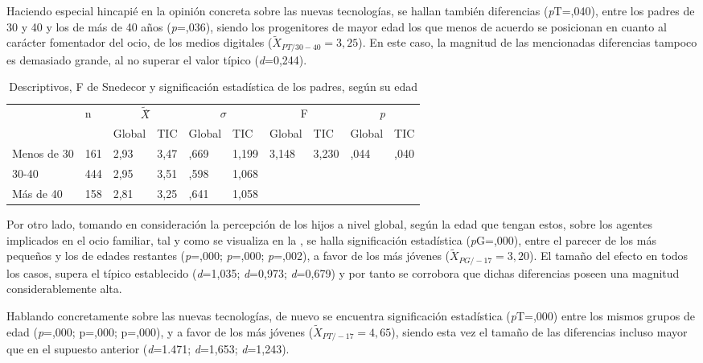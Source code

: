 \documentclass[spanish]{textolivre}
\begin{document}
Haciendo especial hincapié en la opinión concreta sobre las nuevas tecnologías, se hallan también diferencias (\emph{p}T=,040), entre los padres de 30 y 40 y los de más de 40 años (\emph{p}=,036), siendo los progenitores de mayor edad los que menos de acuerdo se posicionan en cuanto al carácter fomentador del ocio, de los medios digitales ($\tilde{X}_{PT/30-40}=3,25$). En este caso, la magnitud de las mencionadas diferencias tampoco es demasiado grande, al no superar el valor típico (\emph{d}=0,244).

\begin{table}[htpb]
\caption{Descriptivos, F de Snedecor y significación estadística de los padres, según su edad}
\label{tab3}
\centering
\begin{tabular}{llllllllll}
\toprule
& \multirow{2}{*}{n} & \multicolumn{2}{c}{$\tilde{X}$̃} & \multicolumn{2}{c}{\begin{math}\sigma\end{math}} & \multicolumn{2}{c}{F} & \multicolumn{2}{c}{\emph{p}}
\\
& & Global & TIC & Global & TIC & Global & TIC & Global & TIC
\\
\midrule
Menos de 30	& 161 & 2,93 & 3,47 & ,669 & 1,199 & 3,148 & 3,230 & ,044 & ,040
\\
30-40 & 444 & 2,95 & 3,51 & ,598 & 1,068 & & & &	 	 
\\
Más de 40 & 158 & 2,81 & 3,25 & ,641 & 1,058 & & & &
\\
\bottomrule
\end{tabular}
\centering
{}
\end{table}

Por otro lado, tomando en consideración la percepción de los hijos a nivel global, según la edad que tengan estos, sobre los agentes implicados en el ocio familiar, tal y como se visualiza en la , se halla significación estadística (\emph{p}G=,000), entre el parecer de los más pequeños y los de edades restantes (\emph{p}=,000; \emph{p}=,000; \emph{p}=,002), a favor de los más jóvenes ($\tilde{X}_{PG/-17}=3,20$). El tamaño del efecto en todos los casos, supera el típico establecido (\emph{d}=1,035; \emph{d}=0,973; \emph{d}=0,679) y por tanto se corrobora que dichas diferencias poseen una magnitud considerablemente alta. 

Hablando concretamente sobre las nuevas tecnologías, de nuevo se encuentra significación estadística (\emph{p}T=,000) entre los mismos grupos de edad (\emph{p}=,000; p=,000; p=,000), y a favor de los más jóvenes ($\tilde{X}_{PT/-17}=4,65$), siendo esta vez el tamaño de las diferencias incluso mayor que en el supuesto anterior (\emph{d}=1.471; \emph{d}=1,653; \emph{d}=1,243).
\end{document}
